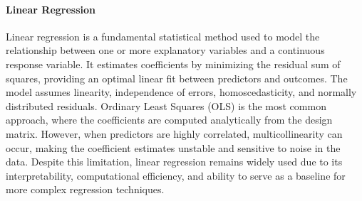 \paragraph{Linear Regression}
\label{sec:background_ml_lr}
Linear regression is a fundamental statistical method used to model the relationship between one or more explanatory variables and a continuous response variable. It estimates coefficients by minimizing the residual sum of squares, providing an optimal linear fit between predictors and outcomes. The model assumes linearity, independence of errors, homoscedasticity, and normally distributed residuals. Ordinary Least Squares (OLS) is the most common approach, where the coefficients are computed analytically from the design matrix. However, when predictors are highly correlated, multicollinearity can occur, making the coefficient estimates unstable and sensitive to noise in the data. Despite this limitation, linear regression remains widely used due to its interpretability, computational efficiency, and ability to serve as a baseline for more complex regression techniques.


